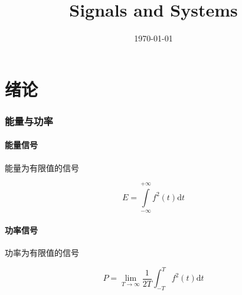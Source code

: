 \documentclass{article}
\title{Signals and Systems}
\author{}
\date{\today}
\begin{document}
\hypersetup{hidelinks,
    allcolors = black,
    breaklinks = true
}

\newtheorem{definition}{Definition}[subsection]
\newtheorem{theorem}{Theorem}[subsection]
\newtheorem{corollary}{Corollary}[theorem]
\renewcommand{\proofname}{\indent\bf Proof}

\def\e{\mathrm e}
\def\i{\mathrm i}
\def\j{\mathrm j}
\def\d{\mathrm d}
\def\C{\mathrm C}
\def\div{\mathrm{div}}
\def\rot{\mathrm{rot}}
\def\vecv{\vec{\mathrm v}}
\def\sr{\mathbb R}
\def\sn{\mathbb N}
\def\snp{\mathbb N^+}
\def\sc{\mathbb C}
\def\sz{\mathbb Z}
\def\impint{\int\limits_{-\infty}^{+\infty}}

\newcommand{\abs}[1]{\left|#1\right|}
\newcommand{\pare}[1]{\left(#1\right)}
\newcommand{\fourier}[1]{\mathscr F\pare{#1}}
\newcommand{\tfourier}[1]{\mathscr F^{-1}\pare{#1}}
\newcommand{\jacobi}[2]{\frac{\partial\pare{#1}}{\partial\pare{#2}}}

\def\ft{f\pare{t}}

\begin{titlepage}
    \maketitle
\end{titlepage}

\tableofcontents
\newpage

\part{绪论}

\section{能量与功率}

\subsection{能量信号}

能量为有限值的信号

\[E=\impint f^2\pare{t}\d t\]

\subsection{功率信号}

功率为有限值的信号

\[P=\lim_{T\to\infty}\frac1{2T}\int_{-T}^Tf^2\pare{t}\d t\]
\end{document}
